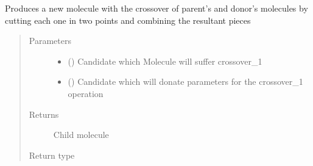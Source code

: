 \documentclass[letterpaper,10pt,english]{sphinxmanual}
\begin{document}
\begin{fulllineitems}

\begin{fulllineitems}
\label{\detokenize{MolOpt:MolOpt.MolOpt.MolOpt.crossover_2}}
\sphinxAtStartPar
Produces a new molecule with the crossover of parent’s and donor’s molecules by cutting each one in two 
points and combining the resultant pieces
\begin{quote}\begin{description}
\item[{Parameters}] \leavevmode\begin{itemize}
\item {} 
\sphinxAtStartPar
{} ({\hyperref[\detokenize{MolOpt.genetic:MolOpt.genetic.genetic.Chromosome}]{}}) \textendash{} Candidate which Molecule will suffer crossover\_1

\item {} 
\sphinxAtStartPar
{} ({\hyperref[\detokenize{MolOpt.genetic:MolOpt.genetic.genetic.Chromosome}]{}}) \textendash{} Candidate which will donate parameters for the crossover\_1 operation

\end{itemize}

\item[{Returns}] \leavevmode
\sphinxAtStartPar
Child molecule

\item[{Return type}] \leavevmode
\sphinxAtStartPar
{\hyperref[\detokenize{MolOpt.molecular:MolOpt.molecular.molecular.Molecule}]{}}

\end{description}\end{quote}


\end{fulllineitems}
\end{fulllineitems}
\end{document}
